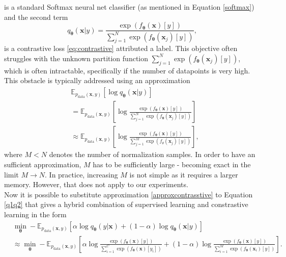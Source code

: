 is a standard Softmax neural net classifier (as mentioned in Equation \eqref{softmax}) and the second term 
\begin{equation}
	q_{\boldsymbol{\theta}}\left(\boldsymbol{x}|y\right) = \frac{\exp\left({f_{\boldsymbol{\theta}}\left(\boldsymbol{x}\right)[y]}\right)}{\sum_{j=1}^N\exp\left({f_{\boldsymbol{\theta}}\left(\boldsymbol{x}_j\right)[y]}\right)},
\end{equation}
is a contrastive loss \eqref{eq:contrastive} attributed a label. This objective  often struggles with the unknown partition function $\sum_{j=1}^N\exp\left({f_{\boldsymbol{\theta}}\left({\boldsymbol{x}_j}\right)[y]}\right)$, which is often intractable, specifically if the number of datapoints is very high. This obstacle is typically addressed using an approximation 
\begin{align}\label{approxcontrasstive}
	&\mathbb{E}_{p_{\mathrm{data}}(\boldsymbol{x},y)}\left[ \log q_{\boldsymbol{\theta}}\left(\boldsymbol{x}|y\right) \right] \\
	&=\mathbb{E}_{p_{\mathrm{data}}(\boldsymbol{x},y)}\left[\log \frac{\exp\left({f_{\boldsymbol{\theta}}\left(\boldsymbol{x}\right)[y]}\right)}{\sum_{j=1}^N\exp\left({f_{\boldsymbol{\theta}}\left(\boldsymbol{x}_j\right)[y]}\right)} \right]  \\
	&\approx\mathbb{E}_{p_{\mathrm{data}}(\boldsymbol{x},y)}\left[\log \frac{\exp\left({f_{\boldsymbol{\theta}}\left(\boldsymbol{x}\right)[y]}\right)}{\sum_{j=1}^M\exp\left({f_\theta\left(\boldsymbol{x}_j\right)[y]}\right)} \right],
\end{align}
where $M < N$ denotes the number of normalization samples. In order to have an sufficient approximation, $M$ has to be sufficiently large - becoming exact in the limit $M \to N$. In practice, increasing $M$ is not simple as it requires a larger memory. However, that does not apply to our experiments. \\
Now it is possible to substitute approximation \eqref{approxcontrasstive} to Equation \eqref{q1q2} that gives a hybrid combination of supervised learning and constrastive learning in the form
\begin{align}\label{eq:q1q2final}
	&\min_{\boldsymbol{\theta}}- \mathbb{E}_{p_{\mathrm{data}}(\boldsymbol{x},y)}\left[\alpha\log q_{\boldsymbol{\theta}}\left(y|\boldsymbol{x}\right)+ \left(1-\alpha\right)\log q_{\boldsymbol{\theta}}\left(\boldsymbol{x}|y\right) \right]  \\
	&\label{eq:hybrid}\approx	\min_{\boldsymbol{\theta}}- \mathbb{E}_{p_{\mathrm{data}}(\boldsymbol{x},y)}\left[\alpha\log \frac{\exp\left({f_{\boldsymbol{\theta}}\left(\boldsymbol{x}\right)[y]}\right)}{\sum_{i=1}^C\exp\left({f_{\boldsymbol{\theta}}\left(\boldsymbol{x}\right)[y_i]}\right)}+ \left(1-\alpha\right)\log \frac{\exp\left({f_{\boldsymbol{\theta}}\left(\boldsymbol{x}\right)[y]}\right)}{\sum_{i=1}^M\exp\left({f_{\boldsymbol{\theta}}\left(\boldsymbol{x}_i\right)[y]}\right)} \right]. 
\end{align}
